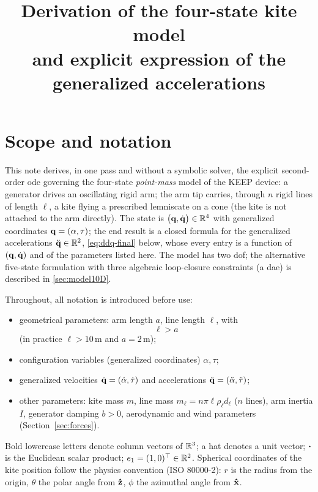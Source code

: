 \documentclass[10pt, a4paper]{article}
\title{Derivation of the four-state kite model\\ and explicit expression of the generalized accelerations}
\author{}
\date{}
\begin{document}
\maketitle

\section{Scope and notation}
\label{sec:scope}

This note derives, in one pass and without a symbolic solver, the explicit
second-order \gls{ode} governing the four-state \emph{point-mass} model of the
KEEP device: a generator drives an oscillating rigid arm; the arm tip
carries, through $n$ rigid lines of length $\ell$, a kite flying a
prescribed lemniscate on a cone (the kite is not attached to the arm
directly).
The state is $\bigl(\vb q, \dot{\vb q}\bigr) \in
\mathbb{R}^4$ with generalized coordinates $\vb q = (\alpha, \tau)$; the end result is a
closed formula for the generalized accelerations $\ddot{\vb q} \in \mathbb{R}^2$,
\eqref{eq:ddq-final} below, whose every entry is a function of $(\vb q, \dot{\vb q})$
and of the parameters listed here.  The model has two \gls{dof}; the
alternative five-state formulation with three algebraic loop-closure
constraints (a \gls{dae}) is described in \ref{sec:model10D}.

Throughout, all notation is introduced before use:
\begin{itemize}
    \item geometrical parameters: arm length $a$, line length $\ell$, with
    \begin{equation} \label{eq:ineq-l-a}
        \ell > a
    \end{equation}
    (in practice $\ell > 10$\,m and $a = 2$\,m);
    \item configuration variables (generalized coordinates) $\alpha, \tau$;
    \item generalized velocities $\dot{\vb q} = (\dot\alpha, \dot\tau)$ and
    accelerations $\ddot{\vb q} = (\ddot\alpha, \ddot\tau)$;
    \item other parameters: kite mass $m$, line mass
    $m_\ell = n \pi \ell \rho_\ell d_\ell$ ($n$ lines), arm inertia $I$,
    generator damping $b > 0$, aerodynamic and wind parameters
    (Section~\ref{sec:forces}).
\end{itemize}
Bold lowercase letters denote column vectors of $\mathbb{R}^3$; a hat denotes a unit
vector; $\vdot$ is the Euclidean scalar product; $e_1 = (1, 0)^\top \in
\mathbb{R}^2$.  Spherical coordinates of the kite position follow the physics
convention (ISO 80000-2): $r$ is the radius from the origin, $\theta$ the
polar angle from $\vu z$, $\phi$ the azimuthal angle from $\vu x$.
\end{document}
